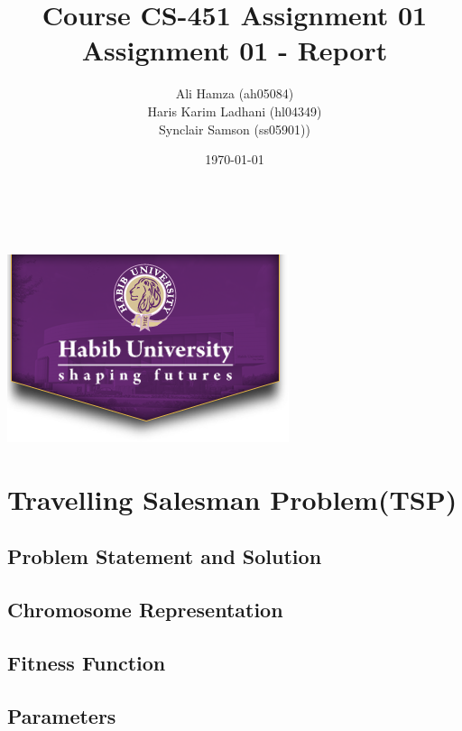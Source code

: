 \documentclass[12pt, letterpaper]{article}
\begin{document}
\title{\large Course CS-451 Assignment 01\\[0.5cm]
        \bf\Large Assignment 01 - Report}
\author{\large Ali Hamza (ah05084) \\ Haris Karim Ladhani (hl04349) \\ Synclair Samson (ss05901))}
\date{\today}
\makeatletter
    \begin{titlepage}
        \begin{center}
        \vbox{}\vspace{5cm}
            {\@title }\\[3cm] 
            {\@author}\\
            \vfill \includegraphics[scale=0.5]{images/logo.png}\\[1cm]
            {\@date}
        \end{center}
    \end{titlepage}
\makeatother

\newpage
\tableofcontents

\section{Travelling Salesman Problem(TSP)}
\subsection{Problem Statement and Solution}
\subsection{Chromosome Representation}

\subsection{Fitness Function}
\subsection{Parameters}
\end{document}
